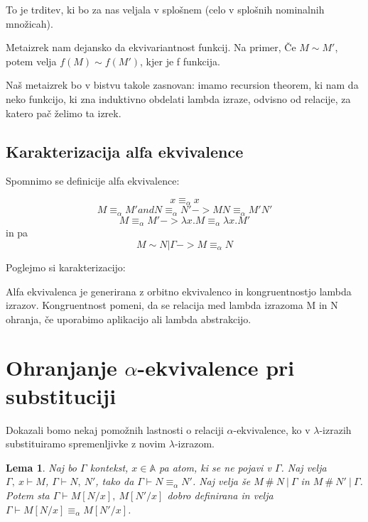 \documentclass{article}
\newtheorem{lema}{Lema}
\begin{document}
To je trditev, ki bo za nas veljala v splošnem (celo v splošnih nominalnih množicah).

Metaizrek nam dejansko da ekvivariantnost funkcij. Na primer, Če \(M \sim M'\), potem velja \(f(M) \sim f(M')\), kjer je f funkcija.

Naš metaizrek bo v bistvu takole zasnovan: imamo recursion theorem, ki nam da neko funkcijo, ki zna induktivno obdelati lambda izraze, odvisno od relacije, za katero pač želimo ta izrek.

\subsection{Karakterizacija alfa ekvivalence}

Spomnimo se definicije alfa ekvivalence:

\[
x \equiv_{\alpha} x
\]
\[
M \equiv_{\alpha} M' and N \equiv_{\alpha} N' -> MN \equiv_{\alpha} M'N'
\]
\[
M \equiv_{\alpha} M' -> \lambda x. M \equiv_{\alpha} \lambda x. M'
\]
in pa
\[
M \sim N | \Gamma -> M \equiv_{\alpha} N
\]

Poglejmo si karakterizacijo:


Alfa ekvivalenca je generirana z orbitno ekvivalenco in kongruentnostjo lambda izrazov. Kongruentnost pomeni, da se relacija med lambda izrazoma M in N ohranja, če uporabimo aplikacijo ali lambda abstrakcijo.


\newpage

\section{Ohranjanje \(\alpha\)-ekvivalence pri substituciji}

Dokazali bomo nekaj pomožnih lastnosti o relaciji \(\alpha\)-ekvivalence, ko v \(\lambda\)-izrazih substituiramo spremenljivke z novim \(\lambda\)-izrazom.

\begin{lema}
    Naj bo \(\Gamma\) kontekst, \(x \in \mathds{A}\) pa atom, ki se ne pojavi v \(\Gamma\). Naj velja \(\Gamma,\ x \vdash M\), \(\Gamma \vdash N,\ N'\), tako da \(\Gamma \vdash N \equiv_\alpha N'\). Naj velja še \(M \ \#\ N \ \vert\ \Gamma\) in \(M \ \#\ N' \ \vert\ \Gamma\). Potem sta \(\Gamma \vdash M[N/x],\ M[N'/x]\) dobro definirana in velja \(\Gamma \vdash M[N/x] \equiv_\alpha M[N'/x]\).
\end{lema}
\end{document}
